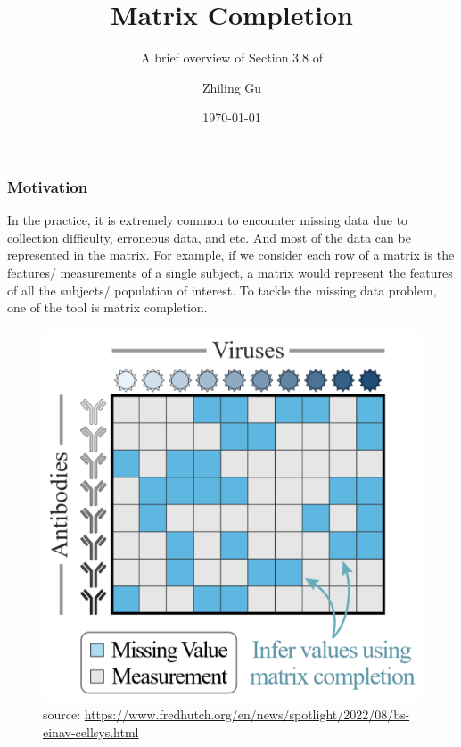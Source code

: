 \documentclass[override]{beamer} %
\newcommand{\vs}{\vspace{0.1in}}
\theoremstyle{remark}
\begin{document}
\title[Matrix Completion]{Matrix Completion}

\subtitle{A brief overview of Section 3.8 of \cite{Chen:2021}}
\author[Zhiling Gu]{Zhiling Gu} %
\date{\today}


\begin{frame}[plain]
\titlepage

\end{frame}
%






\begin{frame} 
\frametitle{Motivation}
In the practice, it is extremely common to encounter missing data due to collection difficulty, erroneous data, and etc.
And most of the data can be represented in the matrix. For example, if we consider each row of a matrix is the features/ measurements of a single subject, a matrix would represent the features of all the subjects/ population of interest.
To tackle the missing data problem, one of the tool is matrix completion. 

\begin{figure}
    \centering
    \includegraphics[width = 0.5 \textwidth]{einav-image.png}
    \caption{source: \url{https://www.fredhutch.org/en/news/spotlight/2022/08/bs-einav-cellsys.html}}
\end{figure}
\end{frame}
\end{document}
